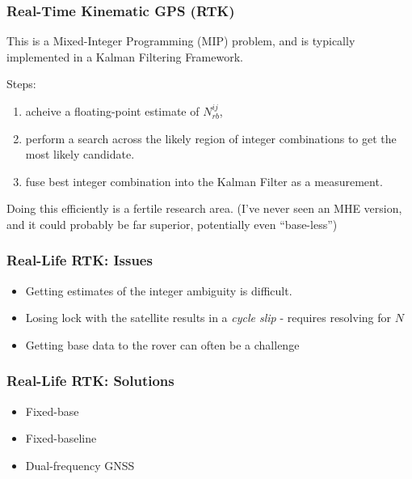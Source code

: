 \documentclass{beamer}
\begin{document}
\begin{frame}\frametitle{Real-Time Kinematic GPS (RTK)}
This is a Mixed-Integer Programming (MIP) problem, and is typically implemented in a Kalman Filtering Framework.

Steps:
\begin{enumerate}
	\item acheive a floating-point estimate of $N_{rb}^{ij}$,
	\item perform a search across the likely region of integer combinations to get the most likely candidate.
	\item fuse best integer combination into the Kalman Filter as a measurement.
\end{enumerate}
Doing this efficiently is a fertile research area. (I've never seen an MHE version, and it could probably be far superior, potentially even ``base-less'')
\end{frame}

\begin{frame}\frametitle{Real-Life RTK: Issues}
\begin{itemize}
	\item Getting estimates of the integer ambiguity is difficult.
	\item Losing lock with the satellite results in a \emph{cycle slip} - requires resolving for $N$
	\item Getting base data to the rover can often be a challenge
\end{itemize}
\end{frame}

\begin{frame}[t]\frametitle{Real-Life RTK: Solutions}    
\begin{itemize}
	\item Fixed-base
	\item Fixed-baseline
	\item Dual-frequency GNSS
\end{itemize}
	

\end{frame}
\end{document}

